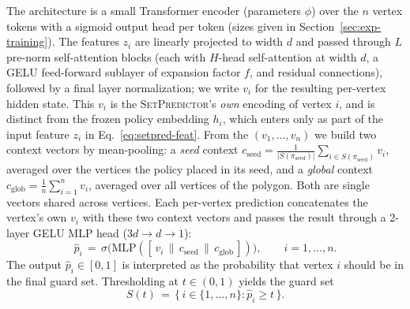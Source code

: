 \documentclass[11pt]{article}
\newcommand{\SetPredictor}{\textup{\textsc{SetPredictor}}}
\begin{document}
The architecture is a small Transformer encoder (parameters $\phi$) over the $n$ vertex tokens with a sigmoid output head per token (sizes given in Section~\ref{sec:exp-training}). The features $z_i$ are linearly projected to width $d$ and passed through $L$ pre-norm self-attention blocks (each with $H$-head self-attention at width $d$, a GELU feed-forward sublayer of expansion factor $f$, and residual connections), followed by a final layer normalization; we write $v_i$ for the resulting per-vertex hidden state. This $v_i$ is the \SetPredictor{}'s \emph{own} encoding of vertex $i$, and is distinct from the frozen policy embedding $h_i$, which enters only as part of the input feature $z_i$ in Eq.~\eqref{eq:setpred-feat}. From the $(v_1, \dots, v_n)$ we build two context vectors by mean-pooling: a \emph{seed} context $c_{\mathrm{seed}} = \tfrac{1}{|S(\pi_{\mathrm{seed}})|}\sum_{i \in S(\pi_{\mathrm{seed}})} v_i$, averaged over the vertices the policy placed in its seed, and a \emph{global} context $c_{\mathrm{glob}} = \tfrac{1}{n}\sum_{i=1}^{n} v_i$, averaged over all vertices of the polygon. Both are single vectors shared across vertices. Each per-vertex prediction concatenates the vertex's own $v_i$ with these two context vectors and passes the result through a 2-layer GELU MLP head ($3d \to d \to 1$):
\begin{equation}
\hat{p}_i \,=\, \sigma\!\big( \mathrm{MLP}([\, v_i \,\|\, c_{\mathrm{seed}} \,\|\, c_{\mathrm{glob}} \,]) \big),\qquad i = 1, \dots, n.
\label{eq:setpred-arch}
\end{equation}
The output $\hat{p}_i \in [0,1]$ is interpreted as the probability that vertex $i$ should be in the final guard set. Thresholding at $t \in (0,1)$ yields the guard set
\begin{equation}
S(t) \,=\, \{\, i \in \{1, \dots, n\} : \hat{p}_i \geq t \,\}.
\label{eq:setpred-decode}
\end{equation}
\end{document}
